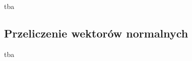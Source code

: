 		
		tba
			
		\subsection{Przeliczenie wektorów normalnych}
		\label{t:symulacja:dzialanie:normalne}
			
	
		tba
		
	
